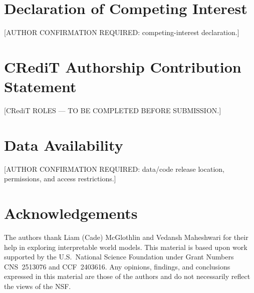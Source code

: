 \documentclass[preprint,12pt]{elsarticle}
\begin{document}
\section*{Declaration of Competing Interest}

[AUTHOR CONFIRMATION REQUIRED: competing-interest declaration.]

\section*{CRediT Authorship Contribution Statement}

[CRediT ROLES --- TO BE COMPLETED BEFORE SUBMISSION.]

\section*{Data Availability}

[AUTHOR CONFIRMATION REQUIRED: data/code release location, permissions, and access restrictions.]

\section*{Acknowledgements}

The authors thank Liam (Cade) McGlothlin and Vedansh Maheshwari for their help in
exploring interpretable world models.
This material is based upon work supported by the U.S.\ National Science Foundation
under Grant Numbers CNS~2513076 and CCF~2403616.
Any opinions, findings, and conclusions expressed in this material are those of the
authors and do not necessarily reflect the views of the NSF.
\end{document}
